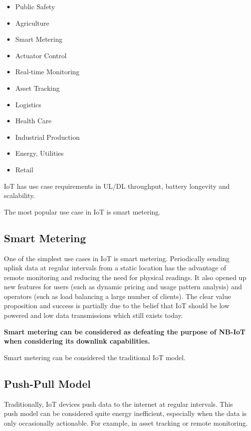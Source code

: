 \documentclass[]{article}
\begin{document}
\begin{itemize}
\item
  Public Safety
\item
  Agriculture
\item
  Smart Metering
\item
  Actuator Control
\item
  Real-time Monitoring
\item
  Asset Tracking
\item
  Logistics
\item
  Health Care
\item
  Industrial Production
\item
  Energy, Utilities
\item
  Retail
\end{itemize}

IoT has use case requirements in UL/DL throughput, battery longevity and
scalability.

The most popular use case in IoT is smart metering.

\hypertarget{smartmetering}{%
\subsection{Smart Metering}\label{smartmetering}}

One of the simplest use cases in IoT is smart metering. Periodically
sending uplink data at regular intervals from a static location has the
advantage of remote monitoring and reducing the need for physical
readings. It also opened up new features for users (such as dynamic
pricing and usage pattern analysis) and operators (such as load
balancing a large number of clients). The clear value proposition and
success is partially due to the belief that IoT should be low powered
and low data transmissions which still exists today.

\textbf{Smart metering can be considered as defeating the purpose of
NB-IoT when considering its downlink capabilities.}

Smart metering can be considered the traditional IoT model.

\hypertarget{push-pull-model}{%
\subsection{Push-Pull Model}\label{push-pull-model}}

Traditionally, IoT devices push data to the internet at regular
intervals. This push model can be considered quite energy inefficient,
especially when the data is only occasionally actionable. For example,
in asset tracking or remote monitoring.
\end{document}

